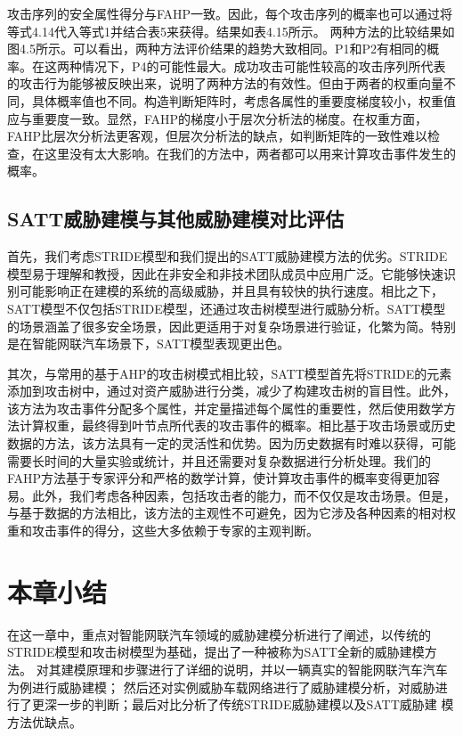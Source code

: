   攻击序列的安全属性得分与FAHP一致。因此，每个攻击序列的概率也可以通过将等式4.14代入等式1并结合表5来获得。结果如表4.15所示。
  两种方法的比较结果如图4.5所示。可以看出，两种方法评价结果的趋势大致相同。P1和P2有相同的概率。在这两种情况下，P4的可能性最大。成功攻击可能性较高的攻击序列所代表的攻击行为能够被反映出来，说明了两种方法的有效性。但由于两者的权重向量不同，具体概率值也不同。构造判断矩阵时，考虑各属性的重要度梯度较小，权重值应与重要度一致。显然，FAHP的梯度小于层次分析法的梯度。在权重方面，FAHP比层次分析法更客观，但层次分析法的缺点，如判断矩阵的一致性难以检查，在这里没有太大影响。在我们的方法中，两者都可以用来计算攻击事件发生的概率。
  
\subsection{SATT威胁建模与其他威胁建模对比评估}
首先，我们考虑STRIDE模型和我们提出的SATT威胁建模方法的优劣。STRIDE模型易于理解和教授，因此在非安全和非技术团队成员中应用广泛。它能够快速识别可能影响正在建模的系统的高级威胁，并且具有较快的执行速度。相比之下，SATT模型不仅包括STRIDE模型，还通过攻击树模型进行威胁分析。SATT模型的场景涵盖了很多安全场景，因此更适用于对复杂场景进行验证，化繁为简。特别是在智能网联汽车场景下，SATT模型表现更出色。

其次，与常用的基于AHP的攻击树模式相比较，SATT模型首先将STRIDE的元素添加到攻击树中，通过对资产威胁进行分类，减少了构建攻击树的盲目性。此外，该方法为攻击事件分配多个属性，并定量描述每个属性的重要性，然后使用数学方法计算权重，最终得到叶节点所代表的攻击事件的概率。相比基于攻击场景或历史数据的方法，该方法具有一定的灵活性和优势。因为历史数据有时难以获得，可能需要长时间的大量实验或统计，并且还需要对复杂数据进行分析处理。我们的FAHP方法基于专家评分和严格的数学计算，使计算攻击事件的概率变得更加容易。此外，我们考虑各种因素，包括攻击者的能力，而不仅仅是攻击场景。但是，与基于数据的方法相比，该方法的主观性不可避免，因为它涉及各种因素的相对权重和攻击事件的得分，这些大多依赖于专家的主观判断。
\section{本章小结}
在这一章中，重点对智能网联汽车领域的威胁建模分析进行了阐述，以传统的STRIDE模型和攻击树模型为基础，提出了一种被称为SATT全新的威胁建模方法。
对其建模原理和步骤进行了详细的说明，并以一辆真实的智能网联汽车汽车为例进行威胁建模；
然后还对实例威胁车载网络进行了威胁建模分析，对威胁进行了更深一步的判断；最后对比分析了传统STRIDE威胁建模以及SATT威胁建
模方法优缺点。